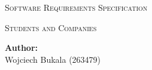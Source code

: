 \begin{titlepage}
    \centering

    \vfill
    
    {\scshape\LARGE Software Requirements Specification\par}
    {\scshape\Large Students and Companies\par}
    

    \vfill
    
    \begin{flushleft}
    \textbf{Author:}\\
    Wojciech Bukala (263479)\\

    \end{flushleft}

    \vspace{1cm}
    
\end{titlepage}